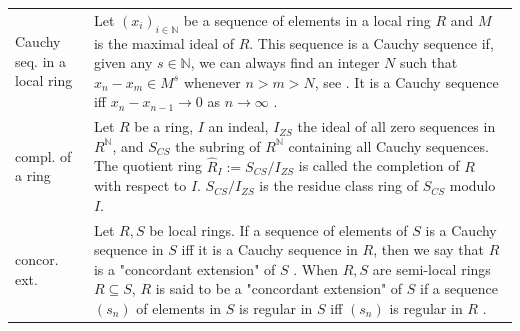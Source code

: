 \documentclass[12pt]{amsart}
\theoremstyle{definition}
\begin{document}
{\begin{table}[H]
\begin{tabular}{|P{1.4cm} p{13.4cm}|}
		Cauchy seq. in a local ring & Let $(x_i)_{i\in\mathbb{N}}$ be a sequence of elements in a local ring $R$ and $M$ is the maximal ideal of $R$. This sequence is a Cauchy sequence if, given any $s\in\mathbb{N}$, we can always find an integer $N$ such that $x_n-x_m\in M^s$ whenever $n>m>N$, see \cite[p.~63, 85]{Ref_Northcott_1953}. It is a Cauchy sequence iff $x_n-x_{n-1}\rightarrow0$ as $n\rightarrow\infty$ \cite[p.~85]{Ref_Northcott_1953}.
		\\
		compl. of a ring & Let $R$ be a ring, $I$ an indeal, $I_{ZS}$ the ideal of all zero sequences in $R^\mathbb{N}$, and $S_{CS}$ the subring of $R^\mathbb{N}$ containing all Cauchy sequences. The quotient ring $\hat R_I:=S_{CS}/I_{ZS}$ is called the completion of $R$ with respect to $I$. $S_{CS}/I_{ZS}$ is the residue class ring of $S_{CS}$ modulo $I$.
		\\
		concor. ext. & Let $R,S$ be local rings. If a sequence of elements of $S$ is a Cauchy sequence in $S$ iff it is a Cauchy sequence in $R$, then we say that $R$ is a "concordant extension" of $S$ \cite[p.~87]{Ref_Northcott_1953}. When $R,S$ are semi-local rings $R\subseteq S$, $R$ is said to be a "concordant extension" of $S$ if a sequence $(s_n)$ of elements in $S$ is regular in $S$ iff $(s_n)$ is regular in $R$ \cite{Ref_Batho_1959}.
		\\ \hline
	\end{tabular}
\end{table}}
\end{document}
